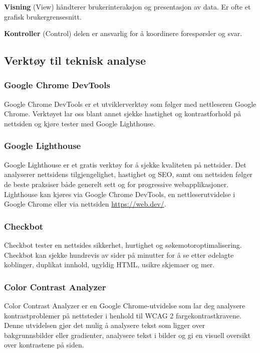 \textbf{Visning} (View) håndterer brukerinteraksjon og presentasjon av data. Er ofte et grafisk brukergrensesnitt.

\textbf{Kontroller} (Control) delen er ansvarlig for å koordinere forespørsler og svar.

\subsection{Verktøy til teknisk analyse}

\subsubsection{Google Chrome DevTools}
\label{sec:google-chrome-devtools}
Google Chrome DevTools \cite{google2019cdt} er et utviklerverktøy som følger med nettleseren Google Chrome. Verktøyet lar oss blant annet sjekke hastighet og kontrastforhold på nettsiden og kjøre tester med Google Lighthouse.

\subsubsection{Google Lighthouse}
\label{sec:google-lighthouse}
Google Lighthouse \cite{google2018lig} er et gratis verktøy for å sjekke kvaliteten på nettsider. Det analyserer nettsidens tilgjengelighet, hastighet og SEO, samt om nettsiden følger de beste praksiser både generelt sett og for progressive webapplikasjoner. Lighthouse kan kjøres via Google Chrome DevTools, en nettleserutvidelse i Google Chrome eller via nettsiden \url{https://web.dev/}.

\subsubsection{Checkbot}
\label{sec:checkbot}
Checkbot \cite{checkbot2019cth} tester en nettsides sikkerhet, hurtighet og søkemotoroptimalisering. Checkbot kan sjekke hundrevis av sider på minutter for å se etter ødelagte koblinger, duplikat innhold, ugyldig HTML, usikre skjemaer og mer.

\subsubsection{Color Contrast Analyzer}
\label{sec:color-contrast-analyzer}
Color Contrast Analyzer \cite{ncstate2013cca} er en Google Chrome-utvidelse som lar deg analysere kontrastproblemer på nettsteder i henhold til WCAG 2 fargekontrastkravene. Denne utvidelsen gjør det mulig å analysere tekst som ligger over bakgrunnsbilder eller gradienter, analysere tekst i bilder og gi en visuell oversikt over kontrastene på siden.

